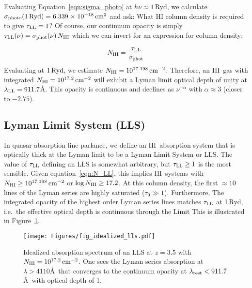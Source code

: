 \documentclass[graybox]{svmult}
\newcommand{\HI}{H{\sc I}}
\def\sci#1{{\; \times \; 10^{#1}}}
\newcommand{\mnhi}{N_{\rm HI}}
\def\cm#1{\, {\rm cm^{#1}}}
\begin{document}
Evaluating Equation~\ref{eqn:sigma_photo} at $h\nu \approx 1$\,Ryd,
we calculate
$\sigma_{\rm photo}(1\,{\rm Ryd}) = 6.339 \sci{-18} \cm{2}$ and
ask: What HI column density is required to give $\tau_{\rm LL} = 1$?
Of course, our continuum opacity is simply
$\tau_{\rm LL}(\nu) = \sigma_{\rm phot}(\nu) \, \mnhi$ which
we can invert for an expression for column density:

\begin{equation}
N_{\rm HI} = \frac{\tau_{\rm LL}}{\sigma_{\rm phot}}
\label{eqn:N_LL}
\end{equation}
Evaluating at $1\,{\rm Ryd}$, we estimate $\mnhi = 10^{17.198} \cm{-2}$.
Therefore, an \HI\ gas with integrated $\mnhi = 10^{17.2} \cm{-2}$
will exhibit a Lyman limit optical depth of unity
at $\lambda_{\rm LL} = 911.7$\AA.  This opacity is continuous
and declines as $\nu^{-\alpha}$ with $\alpha \approx 3$ (closer to $-2.75$).

\subsection{Lyman Limit System (LLS)}

In quasar absorption line parlance, we define 
an \HI\ absorption system that is optically thick at the Lyman limit
to be a Lyman Limit System or LLS.
The value of $\tau_{\rm LL}$ defining an LLS is somewhat arbitrary,
but $\tau_{\rm LL} \ge 1$ is the most sensible.  Given
equation~\ref{eqn:N_LL}, 
this implies \HI\ systems with $\mnhi \ge 10^{17.198} \cm{-2}$ or 
$\log\mnhi \ge 17.2$.
At this column density, the first $\approx 10$ lines of the
Lyman series are highly saturated ($\tau_0 \gg 1$).
Furthermore, 
The integrated opacity of the highest order Lyman series lines
matches $\tau_{\rm LL}$ at 1\,Ryd,
i.e.\ the effective optical depth is continuous through the Limit
This is illustrated in Figure~\ref{fig:ideal_LLS}.

%
\begin{figure}[b]
\sidecaption
\texttt{[image: Figures/fig\_idealized\_lls.pdf]}
%
%
\caption{Idealized absorption spectrum of an LLS at $z=3.5$
with $\mnhi = 10^{17.2} \cm{-2}$. One sees the Lyman series
absorption at $\lambda > 4110$\AA\ that converges to the
continuum opacity at $\lambda_{\rm rest} < 911.7$\AA\
with optical depth of 1.
}
\label{fig:ideal_LLS}       %
\end{figure}
\end{document}
